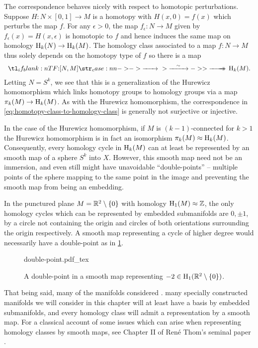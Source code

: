 The correspondence behaves nicely with respect to homotopic perturbations.
Suppose $H : N\times [0,1] \to M$ is a homotopy with $H(x,0)=f(x)$ which perturbs the map $f$. For any $\epsilon>0$, the map $f_\epsilon : N \to M$ given by $f_\epsilon(x)=H(x,\epsilon)$ is homotopic to $f$ and hence induces the same map on homology $\operatorname{H}_k(N)\to \operatorname{H}_k(M)$. The homology class associated to a map $f : N \to M$ thus solely depends on the homotopy type of $f$ so there is a map
\begin{equation}\label{eq:homotopy-class-to-homology-class}
	\lkxfunc{}{[N,M]}{\H_k(M).}
\end{equation}
Letting $N=S^k$, we see that this is a generalization of the Hurewicz homomorphism which links homotopy groups to homology groups via a map $\pi_k(M) \to \operatorname{H}_k(M)$.
As with the Hurewicz homomorphism, the correspondence in \cref{eq:homotopy-class-to-homology-class} is generally not surjective or injective. 

In the case of the Hurewicz homomorphism, if $M$ is $(k-1)$-connected for $k > 1$ the Hurewicz homomorphism is in fact an isomorphism $\pi_{k}(M) \approx \operatorname{H}_{k}(M)$. Consequently, every homology cycle in $\operatorname{H}_{k}(M)$ can at least be represented by an smooth map of a sphere $S^{k}$ into $X$. However, this smooth map need not be an immersion, and even still might have unavoidable ``double-points'' -- multiple points of the sphere mapping to the same point in the image and preventing the smooth map from being an embedding.

\begin{example}
	In the punctured plane $M=\mathbb{R}^2\setminus \{0\}$ with homology $\operatorname{H}_1(M)\approx \mathbb{Z}$, the only homology cycles which can be represented by embedded submanifolds are $0,\pm 1$, by a circle not containing the origin and circles of both orientations surrounding the origin respectively. A smooth map representing a cycle of higher degree would necessarily have a double-point as in \cref{fig:double-point}.
\begin{figure}[ht]
	\centering
	{double-point.pdf_tex}
	\caption{A double-point in a smooth map representing $-2\in \operatorname{H}_1(\mathbb{R}^2\setminus\{0\})$.}\label{fig:double-point}
\end{figure}
\end{example}

That being said, many of the manifolds considered .
many specially constructed manifolds we will consider in this chapter will at least have a basis by embedded submanifolds, and every homology class will admit a representation by a smooth map. For a classical account of some issues which can arise when representing homology classes by smooth maps, see Chapter II of Ren\'e Thom's seminal paper \cite{thom1954}.

